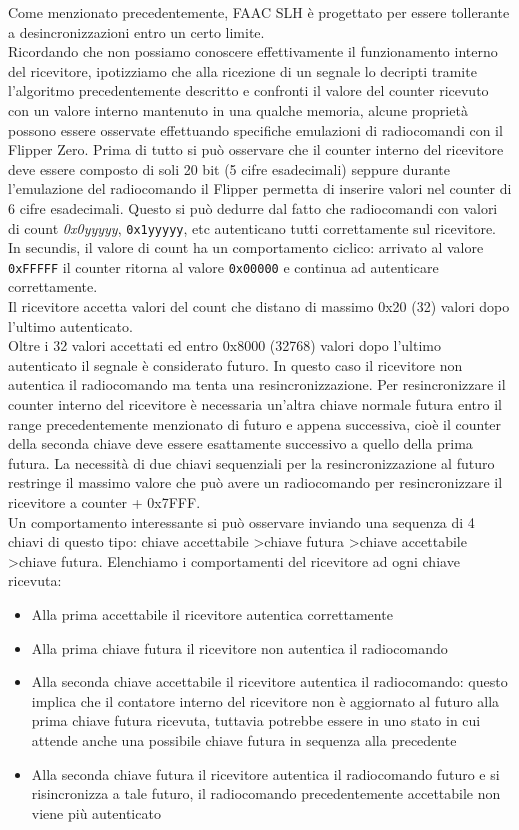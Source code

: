Come menzionato precedentemente, FAAC SLH è progettato per essere tollerante a desincronizzazioni entro un certo limite.\\
Ricordando che non possiamo conoscere effettivamente il funzionamento interno del ricevitore, ipotizziamo che alla ricezione di un segnale lo decripti tramite l’algoritmo precedentemente descritto e confronti il valore del counter ricevuto con un valore interno mantenuto in una qualche memoria, alcune proprietà possono essere osservate effettuando specifiche emulazioni di radiocomandi con il Flipper Zero.
Prima di tutto si può osservare che il counter interno del ricevitore deve essere composto di soli 20 bit (5 cifre esadecimali) seppure durante l’emulazione del radiocomando il Flipper permetta di inserire valori nel counter di 6 cifre esadecimali. Questo si può dedurre dal fatto che radiocomandi con valori di count \textsl{0x0yyyyy}, \texttt{0x1yyyyy}, etc autenticano tutti correttamente sul ricevitore.\\
In secundis, il valore di count ha un comportamento ciclico: arrivato al valore \texttt{0xFFFFF} il counter ritorna al valore \texttt{0x00000} e continua ad autenticare correttamente.\\
Il ricevitore accetta valori del count che distano di massimo 0x20 (32) valori dopo l’ultimo autenticato.\\
Oltre i 32 valori accettati ed entro 0x8000 (32768) valori dopo l’ultimo autenticato il segnale è considerato futuro. In questo caso il ricevitore non autentica il radiocomando ma tenta una resincronizzazione. Per resincronizzare il counter interno del ricevitore è necessaria un’altra chiave normale futura entro il range precedentemente menzionato di futuro e appena successiva, cioè il counter della seconda chiave deve essere esattamente successivo a quello della prima futura. La necessità di due chiavi sequenziali per la resincronizzazione al futuro restringe il massimo valore che può avere un radiocomando per resincronizzare il ricevitore a counter + 0x7FFF.\\
Un comportamento interessante si può osservare inviando una sequenza di 4 chiavi di questo tipo: chiave accettabile \textgreater chiave futura \textgreater chiave accettabile \textgreater chiave futura. Elenchiamo i comportamenti del ricevitore ad ogni chiave ricevuta:
\begin{itemize}
  \item Alla prima accettabile il ricevitore autentica correttamente
  \item Alla prima chiave futura il ricevitore non autentica il radiocomando
  \item Alla seconda chiave accettabile il ricevitore autentica il radiocomando: questo implica che il contatore interno del ricevitore non è aggiornato al futuro alla prima chiave futura ricevuta, tuttavia potrebbe essere in uno stato in cui attende anche una possibile chiave futura in sequenza alla precedente
  \item Alla seconda chiave futura il ricevitore autentica il radiocomando futuro e si risincronizza a tale futuro, il radiocomando precedentemente accettabile non viene più autenticato
\end{itemize}
